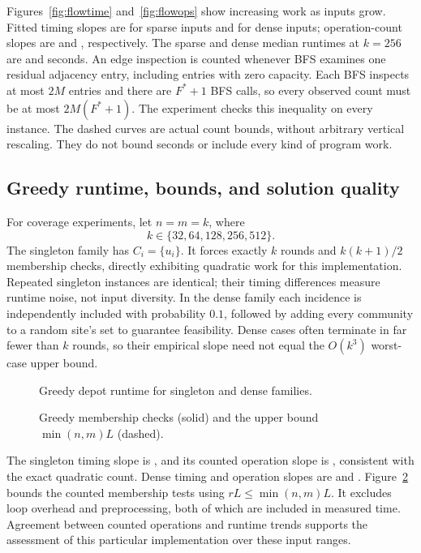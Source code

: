 \documentclass[sigconf,nonacm]{acmart}
\begin{document}
Figures~\ref{fig:flowtime} and~\ref{fig:flowops} show increasing work as inputs
grow. Fitted timing slopes are \FlowSparseTimingSlope{} for sparse inputs
and \FlowDenseTimingSlope{} for dense inputs; operation-count slopes are
\FlowSparseOperationSlope{} and \FlowDenseOperationSlope{}, respectively.
The sparse and dense median runtimes at $k=256$ are
\FlowSparseLargestSeconds{} and \FlowDenseLargestSeconds{} seconds.
An edge inspection is counted whenever BFS examines one residual adjacency
entry, including entries with zero capacity. Each BFS inspects at most $2M$
entries and there are $F^*+1$ BFS calls, so every observed count must be at
most $2M(F^*+1)$. The experiment checks this inequality on every instance.
The dashed curves are actual count bounds, without arbitrary vertical
rescaling. They do not bound seconds or include every kind of program work.

\subsection{Greedy runtime, bounds, and solution quality}
For coverage experiments, let $n=m=k$, where
\[k\in\{32,64,128,256,512\}.\]
The singleton family has $C_i=\{u_i\}$.
It forces exactly $k$ rounds and $k(k+1)/2$ membership checks, directly
exhibiting quadratic work for this implementation. Repeated singleton
instances are identical; their timing differences measure runtime noise,
not input diversity. In the dense family each incidence is independently
included with probability $0.1$, followed by adding every community to a
random site's set to guarantee feasibility. Dense cases often terminate in
far fewer than $k$ rounds, so their empirical slope need not equal the
$O(k^3)$ worst-case upper bound.

\begin{figure}[t]
\centering
\caption{Greedy depot runtime for singleton and dense families.}
\label{fig:covertime}
\end{figure}
\begin{figure}[t]
\centering
\caption{Greedy membership checks (solid) and the upper bound
$\min(n,m)L$ (dashed).}\label{fig:coverops}
\end{figure}

The singleton timing slope is \CoverSingletonTimingSlope{}, and its counted
operation slope is \CoverSingletonOperationSlope{}, consistent with the
exact quadratic count. Dense timing and operation slopes are
\CoverDenseTimingSlope{} and \CoverDenseOperationSlope{}.
Figure~\ref{fig:coverops} bounds the counted membership tests using
$rL\le\min(n,m)L$. It excludes loop overhead and preprocessing, both of
which are included in measured time. Agreement between counted operations
and runtime trends supports the assessment of this particular implementation
over these input ranges.
\end{document}
